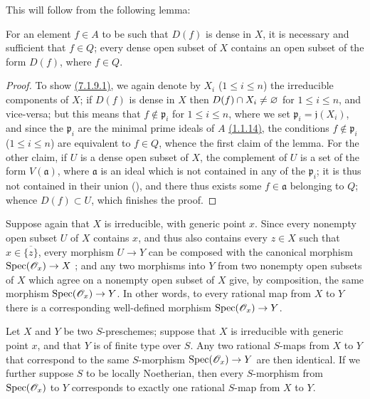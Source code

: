 This will follow from the following lemma:
\begin{lemma}[7.1.9.1]
\label{I.7.1.9.1}
For an element $f\in A$ to be such that $D(f)$ is dense in $X$, it is necessary and sufficient that $f\in Q$; every dense open subset of $X$ contains an open subset of the form $D(f)$, where $f\in Q$.
\end{lemma}

\begin{proof}
To show \hyperref[1.7.1.9.1]{(7.1.9.1)}, we again denote by $X_i$ ($1\leq i\leq n$) the irreducible components of $X$; if $D(f)$ is dense in $X$ then $D(f)\cap X_i\neq\varnothing$ for $1\leq i\leq n$, and vice-versa; but this means that $f\not\in\mathfrak{p}_i$ for $1\leq i\leq n$, where we set $\mathfrak{p}_i=\mathfrak{j}(X_i)$, and since the $\mathfrak{p}_i$ are the minimal prime ideals of $A$ \hyperref[1.1.1.14]{(1.1.14)}, the conditions $f\not\in\mathfrak{p}_i$ ($1\leq i\leq n$) are equivalent to $f\in Q$, whence the first claim of the lemma.
For the other claim, if $U$ is a dense open subset of $X$, the complement of $U$ is a set of the form $V(\mathfrak{a})$, where $\mathfrak{a}$ is an ideal which is not contained in any of the $\mathfrak{p}_i$; it is thus not contained in their union (\cite[p.~13]{I-10}), and there thus exists some $f\in\mathfrak{a}$ belonging to $Q$; whence $D(f)\subset U$, which finishes the proof.
\end{proof}

\begin{env}[7.1.10]
\label{I.7.1.10}
Suppose again that $X$ is irreducible, with generic point $x$.
Since every nonempty open subset $U$ of $X$ contains $x$, and thus also contains every $z\in X$ such that $x\in\overline{\{z\}}$, every morphism $U\to Y$ can be composed with the canonical morphism $\Spec(\sh{O}_x)\to X$ ; and any two morphisms into $Y$ from two nonempty open subsets of $X$ which agree on a nonempty open subset of $X$ give, by composition, the same morphism $\Spec(\sh{O}_x)\to Y$.
In other words, to every rational map from $X$ to $Y$ there is a corresponding well-defined morphism $\Spec(\sh{O}_x)\to Y$.
\end{env}

\begin{proposition}[7.1.11]
\label{I.7.1.11}
Let $X$ and $Y$ be two $S$-preschemes; suppose that $X$ is irreducible with generic point $x$, and that $Y$ is of finite type over $S$.
Any two rational $S$-maps from $X$ to $Y$ that correspond to the same $S$-morphism $\Spec(\sh{O}_x)\to Y$ are then identical.
If we further suppose $S$ to be locally Noetherian, then every $S$-morphism from $\operatorname{Spec}(\mathscr{O}_x)$ to $Y$ corresponds to exactly one rational $S$-map from $X$ to $Y$.
\end{proposition}

